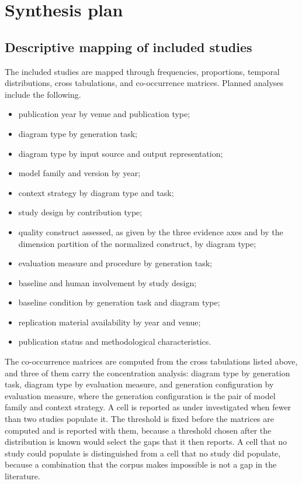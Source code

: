 \section{Synthesis plan}
\label{sec:protocol_synthesis}

\subsection{Descriptive mapping of included studies}

The included studies are mapped through frequencies, proportions, temporal distributions, cross tabulations, and co-occurrence matrices. Planned analyses include the following.

\begin{itemize}
    \item publication year by venue and publication type;
    \item diagram type by generation task;
    \item diagram type by input source and output representation;
    \item model family and version by year;
    \item context strategy by diagram type and task;
    \item study design by contribution type;
    \item quality construct assessed, as given by the three evidence axes and by the dimension partition of the normalized construct, by diagram type;
    \item evaluation measure and procedure by generation task;
    \item baseline and human involvement by study design;
    \item baseline condition by generation task and diagram type;
    \item replication material availability by year and venue;
    \item publication status and methodological characteristics.
\end{itemize}

The co-occurrence matrices are computed from the cross tabulations listed above, and three of them carry the concentration analysis: diagram type by generation task, diagram type by evaluation measure, and generation configuration by evaluation measure, where the generation configuration is the pair of model family and context strategy. A cell is reported as under investigated when fewer than two studies populate it. The threshold is fixed before the matrices are computed and is reported with them, because a threshold chosen after the distribution is known would select the gaps that it then reports. A cell that no study could populate is distinguished from a cell that no study did populate, because a combination that the corpus makes impossible is not a gap in the literature.

